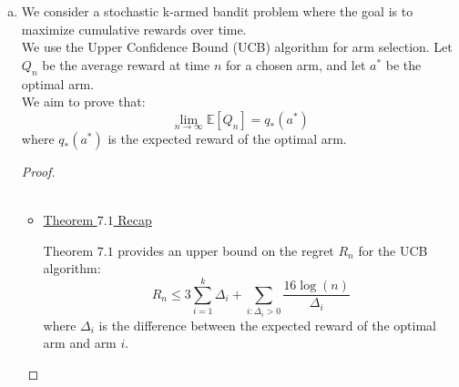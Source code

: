 \documentclass{article}
\begin{document}
\begin{enumerate}[a)]
\begin{itemize}
\begin{enumerate}
    \item \textbf{Choosing \( u_i \) and \( c \):}\par 
    The choice of \( u_i \) is made to ensure that the upper confidence bound for suboptimal arm \( a_i \) is properly controlled. A natural choice for \( u_i \), considering the balance between exploration and exploitation, is given by:
    \[ u_i = \left\lceil \frac{2 \log(1/\delta)}{(1 - c)^2 \Delta_i^2} \right\rceil \]
    where \( \delta \) is the confidence level parameter, and \( c \) is a constant. 

    In the proof, \( c \) is chosen to be \( 1/2 \) somewhat arbitrarily but in a way that balances the two terms in the regret bound. This choice leads to a simplification of the regret bound while maintaining a balance between exploration and exploitation.

    \item \textbf{Finalizing the Bound on \( R_t \):}\par 
    With \( u_i \) and \( c \) chosen, the final bound on \( R_t \) is derived by substituting these values into the regret decomposition:
    \[ R_t \leq \sum_{i: \Delta_i > 0} \Delta_i \left( \left\lceil \frac{2 \log(1/\delta)}{(1 - c)^2 \Delta_i^2} \right\rceil + t P(G^c_i) \right) \]
    Applying the choice of \( c = 1/2 \), the final bound simplifies to:
    \[ R_t \leq 3 \sum_{i=1}^{k} \Delta_i + \sum_{i: \Delta_i > 0} \frac{16 \log(t)}{\Delta_i} \]
\end{enumerate}

        
        
    \end{itemize}
    
    \item 
    We consider a stochastic k-armed bandit problem where the goal is to maximize cumulative rewards over time.\\ 
    We use the Upper Confidence Bound (UCB) algorithm for arm selection. Let $Q_n$ be the average reward at time $n$ for a chosen arm, and let $a^*$ be the optimal arm.\\ 
    We aim to prove that:
    \[ \lim_{n \to \infty} \mathbb{E}[Q_n] = q_{*}(a^*) \]
    where $q_{*}(a^*)$ is the expected reward of the optimal arm.

    \begin{proof}
        \renewcommand{\qedsymbol}{$\blacksquare$}
        \hfill\\\\
        \begin{itemize}
            \item \underline{Theorem $7.1$ Recap}\par
            Theorem $7.1$ provides an upper bound on the regret $R_n$ for the UCB algorithm:
            \[ R_n \leq 3 \sum_{i=1}^{k} \Delta_i + \sum_{i: \Delta_i > 0} \frac{16 \log(n)}{\Delta_i} \]
            where $\Delta_i$ is the difference between the expected reward of the optimal arm and arm $i$.


\end{itemize}
\end{proof}
\end{enumerate}
\end{document}
